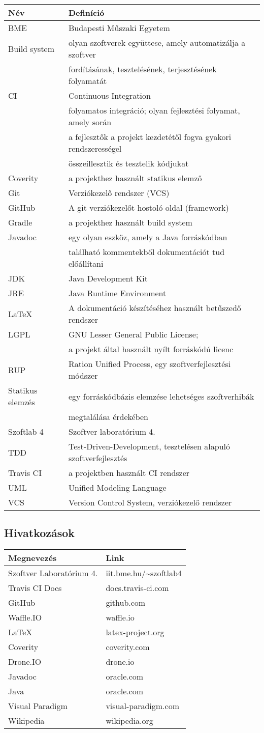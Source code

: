 \begin{tabularx}{\textwidth}{| l | l |}
\hline
\textbf{Név} & \textbf{Definíció} \tabularnewline 
\hline\hline
\endhead
BME & Budapesti Műszaki Egyetem \tabularnewline \hline
Build system & olyan szoftverek együttese, amely automatizálja a szoftver \\
             & fordításának, tesztelésének, terjesztésének folyamatát \tabularnewline \hline
CI & Continuous Integration \\ 
   & folyamatos integráció; olyan fejlesztési folyamat, amely során \\
   & a fejlesztők a projekt kezdetétől fogva gyakori rendszerességel \\
   & összeillesztik és tesztelik kódjukat\tabularnewline \hline
Coverity & a projekthez használt statikus elemző \tabularnewline \hline
Git & Verziókezelő rendszer (VCS) \tabularnewline \hline
GitHub & A git verziókezelőt hostoló oldal (framework) \tabularnewline \hline
Gradle & a projekthez használt build system \tabularnewline \hline
Javadoc & egy olyan eszköz, amely a Java forráskódban \\ 
        & található kommentekből dokumentációt tud előállítani \tabularnewline \hline
JDK & Java Development Kit \tabularnewline \hline
JRE & Java Runtime Environment \tabularnewline \hline
LaTeX & A dokumentáció készítéséhez használt betűszedő rendszer \tabularnewline \hline
LGPL & GNU Lesser General Public License; \\ 
     & a projekt által használt nyílt forráskódú licenc \tabularnewline \hline
RUP & Ration Unified Process, egy szoftverfejlesztési módszer \tabularnewline \hline
Statikus elemzés & egy forráskódbázis elemzése lehetséges szoftverhibák \\
                  & megtalálása érdekében \tabularnewline \hline
Szoftlab 4 & Szoftver laboratórium 4. \tabularnewline \hline
TDD & Test-Driven-Development, tesztelésen alapuló szoftverfejlesztés \tabularnewline \hline
Travis CI & a projektben használt CI rendszer \tabularnewline \hline
UML & Unified Modeling Language \tabularnewline \hline
VCS & Version Control System, verziókezelő rendszer \tabularnewline \hline
\end{tabularx}


\subsection{Hivatkozások}
\begin{tabularx}{\textwidth}{| l | l |}
\hline
\textbf{Megnevezés} & \textbf{Link} \tabularnewline 
\hline\hline
\endhead
Szoftver Laboratórium 4. & iit.bme.hu/\textasciitilde szoftlab4 \tabularnewline \hline
Travis CI Docs & docs.travis-ci.com \tabularnewline \hline
GitHub & github.com \tabularnewline \hline
Waffle.IO & waffle.io  \tabularnewline \hline
LaTeX & latex-project.org \tabularnewline \hline
Coverity & coverity.com \tabularnewline \hline
Drone.IO & drone.io \tabularnewline \hline
Javadoc & oracle.com \tabularnewline \hline
Java & oracle.com \tabularnewline \hline
Visual Paradigm & visual-paradigm.com \tabularnewline \hline
Wikipedia & wikipedia.org \tabularnewline \hline
\end{tabularx}


